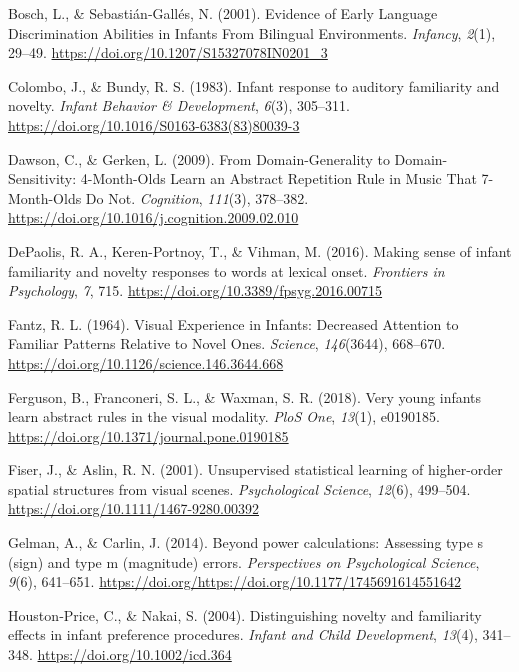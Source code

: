 \documentclass[english,man,man,floatsintext]{apa6}
\begin{document}
\leavevmode\hypertarget{ref-bosch2001}{}%
Bosch, L., \& Sebastián‐Gallés, N. (2001). Evidence of Early Language Discrimination Abilities in Infants From Bilingual Environments. \emph{Infancy}, \emph{2}(1), 29--49. \url{https://doi.org/10.1207/S15327078IN0201_3}

\leavevmode\hypertarget{ref-colombo1983}{}%
Colombo, J., \& Bundy, R. S. (1983). Infant response to auditory familiarity and novelty. \emph{Infant Behavior \& Development}, \emph{6}(3), 305--311. \url{https://doi.org/10.1016/S0163-6383(83)80039-3}

\leavevmode\hypertarget{ref-dawson2009}{}%
Dawson, C., \& Gerken, L. (2009). From Domain-Generality to Domain-Sensitivity: 4-Month-Olds Learn an Abstract Repetition Rule in Music That 7-Month-Olds Do Not. \emph{Cognition}, \emph{111}(3), 378--382. \url{https://doi.org/10.1016/j.cognition.2009.02.010}

\leavevmode\hypertarget{ref-depaolis2016}{}%
DePaolis, R. A., Keren-Portnoy, T., \& Vihman, M. (2016). Making sense of infant familiarity and novelty responses to words at lexical onset. \emph{Frontiers in Psychology}, \emph{7}, 715. \url{https://doi.org/10.3389/fpsyg.2016.00715}

\leavevmode\hypertarget{ref-fantz1964}{}%
Fantz, R. L. (1964). Visual Experience in Infants: Decreased Attention to Familiar Patterns Relative to Novel Ones. \emph{Science}, \emph{146}(3644), 668--670. \url{https://doi.org/10.1126/science.146.3644.668}

\leavevmode\hypertarget{ref-ferguson2018}{}%
Ferguson, B., Franconeri, S. L., \& Waxman, S. R. (2018). Very young infants learn abstract rules in the visual modality. \emph{PloS One}, \emph{13}(1), e0190185. \url{https://doi.org/10.1371/journal.pone.0190185}

\leavevmode\hypertarget{ref-fiser2001}{}%
Fiser, J., \& Aslin, R. N. (2001). Unsupervised statistical learning of higher-order spatial structures from visual scenes. \emph{Psychological Science}, \emph{12}(6), 499--504. \url{https://doi.org/10.1111/1467-9280.00392}

\leavevmode\hypertarget{ref-gelman2014}{}%
Gelman, A., \& Carlin, J. (2014). Beyond power calculations: Assessing type s (sign) and type m (magnitude) errors. \emph{Perspectives on Psychological Science}, \emph{9}(6), 641--651. \url{https://doi.org/https://doi.org/10.1177/1745691614551642}

\leavevmode\hypertarget{ref-houston-price2004}{}%
Houston‐Price, C., \& Nakai, S. (2004). Distinguishing novelty and familiarity effects in infant preference procedures. \emph{Infant and Child Development}, \emph{13}(4), 341--348. \url{https://doi.org/10.1002/icd.364}
\end{document}
